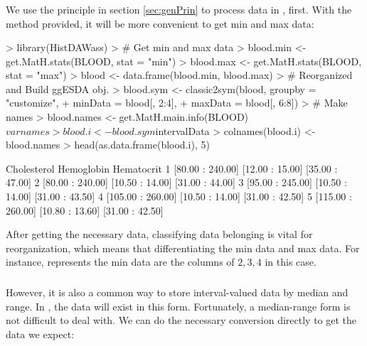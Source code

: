 \documentclass[article]{jss}
\begin{document}
\subsubsection[HistDAWass]{}

We use the principle in section \ref{sec:genPrin} to process  data in , first. With the method  provided, it will be more convenient to get min and max data:

\begin{Schunk}
\begin{Sinput}
> library(HistDAWass)
> # Get min and max data
> blood.min <- get.MatH.stats(BLOOD, stat = "min")
> blood.max <- get.MatH.stats(BLOOD, stat = "max")
> blood <- data.frame(blood.min, blood.max)
> # Reorganized and Build ggESDA obj.
> blood.sym <- classic2sym(blood, groupby = "customize",
+                      minData = blood[, 2:4],
+                      maxData = blood[, 6:8])
> # Make names
> blood.names <- get.MatH.main.info(BLOOD)$varnames
> blood.i <- blood.sym$intervalData
> colnames(blood.i) <- blood.names
> head(as.data.frame(blood.i), 5)
\end{Sinput}
\begin{Soutput}
        Cholesterol      Hemoglobin      Hematocrit
1  [80.00 : 240.00] [12.00 : 15.00] [35.00 : 47.00]
2  [80.00 : 240.00] [10.50 : 14.00] [31.00 : 44.00]
3  [95.00 : 245.00] [10.50 : 14.00] [31.00 : 43.50]
4 [105.00 : 260.00] [10.50 : 14.00] [31.00 : 42.50]
5 [115.00 : 260.00] [10.80 : 13.60] [31.00 : 42.50]
\end{Soutput}
\end{Schunk}

After getting the necessary data, classifying data belonging is vital for reorganization, which means that differentiating the min data and max data. For instance,  represents the min data are the columns of $2,3,4$ in this case.

\subsubsection[MAINT.Data]{}

However, it is also a common way to store interval-valued data by median and range. In , the data will exist in this form. Fortunately, a median-range form is not difficult to deal with. We can do the necessary conversion directly to get the data we expect:
\end{document}
